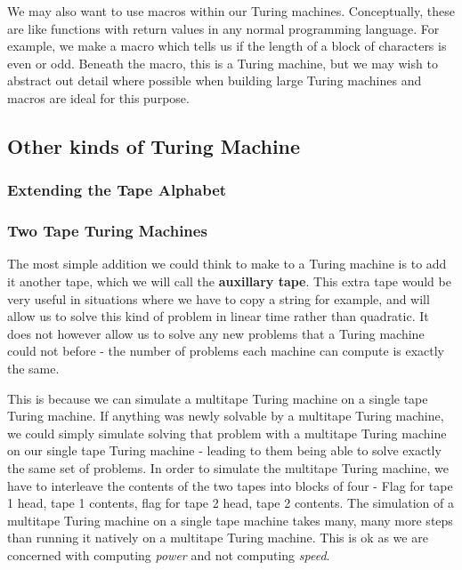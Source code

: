 \documentclass[11pt]{article}
\begin{document}
	We may also want to use macros within our Turing machines. Conceptually, these are like functions with return values in any normal programming language. For example, we make a macro which tells us if the length of a block of characters is even or odd. Beneath the macro, this is a Turing machine, but we may wish to abstract out detail where possible when building large Turing machines and macros are ideal for this purpose.
	
	\subsection{Other kinds of Turing Machine}
	\subsubsection{Extending the Tape Alphabet}
	\subsubsection{Two Tape Turing Machines}
	The most simple addition we could think to make to a Turing machine is to add it another tape, which we will call the \textbf{auxillary tape}. This extra tape would be very useful in situations where we have to copy a string for example, and will allow us to solve this kind of problem in linear time rather than quadratic. It does not however allow us to solve any new problems that a Turing machine could not before - the number of problems each machine can compute is exactly the same.
	
	\par 
	This is because we can simulate a multitape Turing machine on a single tape Turing machine. If anything was newly solvable by a multitape Turing machine, we could simply simulate solving that problem with a multitape Turing machine on our single tape Turing machine - leading to them being able to solve exactly the same set of problems. In order to simulate the multitape Turing machine, we have to interleave the contents of the two tapes into blocks of four - Flag for tape 1 head, tape 1 contents, flag for tape 2 head, tape 2 contents. The simulation of a multitape Turing machine on a single tape machine takes many, many more steps than running it natively on a multitape Turing machine. This is ok as we are concerned with computing \textit{power} and not computing \textit{speed}.
	
\end{document}
